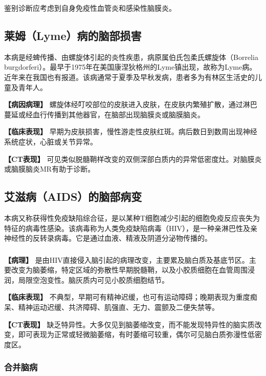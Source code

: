 鉴别诊断应考虑到自身免疫性血管炎和感染性脑膜炎。

\subsection{莱姆（Lyme）病的脑部损害}

本病是经蜱传播、由螺旋体引起的炎性疾患，病原属伯氏包柔氏螺旋体（Borrelia
burgdorferi）。最早于1975年在美国康涅狄格州的Lyme镇出现，故称为Lyme病。近年来在我国也有报道。该病通常于夏季及早秋发病，患者多为有林区生活史的儿童及青年人。

\textbf{【病因病理】}
螺旋体经叮咬部位的皮肤进入皮肤，在皮肤内繁殖扩散，通过淋巴蔓延或经血行传播到其他器官，在脑部出现脑膜炎或脑膜脑炎。

\textbf{【临床表现】}
早期为皮肤损害，慢性游走性皮肤红斑。病后数日到数周出现神经系统症状，心脏或关节异常。

\textbf{【CT表现】}
可见类似脱髓鞘样改变的双侧深部白质内的异常低密度灶。对脑膜炎或脑膜脑炎MR有助于诊断。

\subsection{艾滋病（AIDS）的脑部病变}

本病又称获得性免疫缺陷综合征，是以某种T细胞减少引起的细胞免疫反应丧失为特征的病毒性感染。该病毒称为人类免疫缺陷病毒（HIV），是一种亲淋巴性及亲神经性的反转录病毒。它是通过血液、精液及阴道分泌物传播的。

\subsubsection{}

\textbf{【病理】}
是由HIV直接侵入脑引起的病理改变，主要累及脑白质及基底节区。主要改变为脑萎缩，特定区域的弥散性早期脱髓鞘，以及小胶质细胞在血管周围浸润，局限空泡变性。脑灰质内可见小胶质细胞结节。

\textbf{【临床表现】}
不典型，早期可有精神迟缓，也可有运动障碍；晚期表现为重度痴呆、精神运动迟缓、共济障碍、肌强直、无力、震颤及二便失禁等。

\textbf{【CT表现】}
缺乏特异性。大多仅见到脑萎缩改变，而不能发现特异性的脑实质改变，即可表现为正常或轻微脑萎缩，有时萎缩可较重，偶尔可见脑白质弥漫性低密度区。

\subsubsection{合并脑病}

